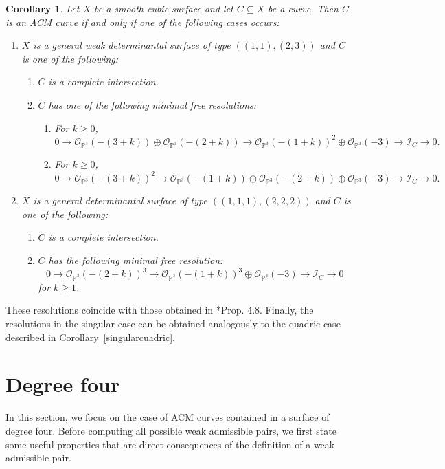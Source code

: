 \documentclass[12pt,reqno]{amsart}
\theoremstyle{plain}
\newtheorem{cor}[theorem]{Corollary}
\theoremstyle{definition}
\theoremstyle{remark}
\theoremstyle{definition}
\newcommand{\PP}{\mathds{P}}
\newcommand{\PPP}{\PP^{3}}
\newcommand{\ii}{\mathscr{I}}
\newcommand{\oo}{\mathcal{O}}
\begin{document}
\begin{cor}
Let $X$ be a smooth cubic surface and let $C\subseteq X$ be a curve. Then $C$ is an ACM curve if and only if one of the following cases occurs:
\begin{enumerate}
\item $X$ is a general weak determinantal surface of type $((1,1),(2,3))$ and $C$ is one of the following:
\begin{enumerate}[label=(\roman*)]
\item $C$ is a complete intersection.
\item $C$ has one of the following minimal free resolutions:
\begin{enumerate}[label=\Alph*]
\item For $k\geq 0$,
\[
0\to \oo_{\PPP}(-(3+k))\oplus \oo_{\PPP}(-(2+k))
\to \oo_{\PPP}(-(1+k))^{2}\oplus \mathcal{O}_{\PPP}(-3)
\to \ii_{C}\to 0.
\]
\item For $k\geq 0$,
\[
0\to \oo_{\PPP}(-(3+k))^{2}
\to \oo_{\PPP}(-(1+k))\oplus \oo_{\PPP}(-(2+k))\oplus \mathcal{O}_{\PPP}(-3)
\to \ii_{C}\to 0.
\]
\end{enumerate}
\end{enumerate}

\item $X$ is a general determinantal surface of type $((1,1,1),(2,2,2))$ and $C$ is one of the following:
\begin{enumerate}[label=(\roman*)]
\item $C$ is a complete intersection.
\item $C$ has the following minimal free resolution:
\[
0\to \oo_{\PPP}(-(2+k))^{3}
\to \oo_{\PPP}(-(1+k))^{3}\oplus \mathcal{O}_{\PPP}(-3)
\to \ii_{C}\to 0
\]
for $k\geq 1$.
\end{enumerate}
\end{enumerate}
\end{cor}

These resolutions coincide with those obtained in \cite{mwa}*{Prop. 4.8}. Finally, the resolutions in the singular case can be obtained analogously to the quadric case described in Corollary~\ref{singularcuadric}.



\section{Degree four} \label{sec::3}

In this section, we focus on the case of ACM curves contained in a surface of degree four. Before computing all possible weak admissible pairs, we first state some useful properties that are direct consequences of the definition of a weak admissible pair.
\end{document}
